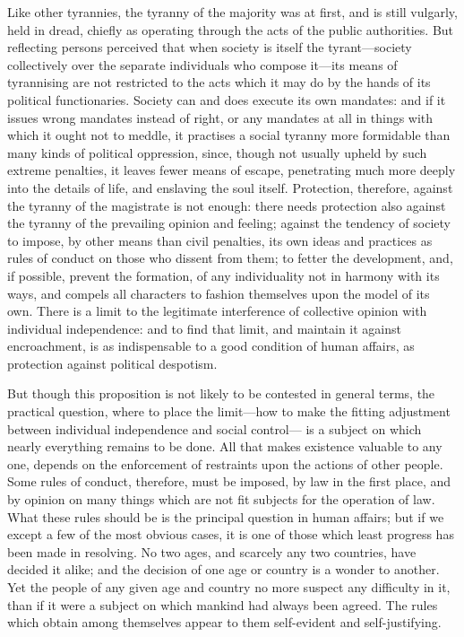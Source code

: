 \documentclass[11pt,openany]{book}
\begin{document}
Like other tyrannies, the tyranny of the majority was at first, and is still vulgarly, held in dread, chiefly as operating through the acts of the public authorities. But reflecting persons perceived that when society is itself the tyrant---society collectively over the separate individuals who compose it---its means of tyrannising are not restricted to the acts which it may do by the hands of its political functionaries. Society can and does execute its own mandates: and if it issues wrong mandates instead of right, or any mandates at all in things with which it ought not to meddle, it practises a social tyranny more formidable than many kinds of political oppression, since, though not usually upheld by such extreme penalties, it leaves fewer means of escape, penetrating much more deeply into the details of life, and enslaving the soul itself. Protection, therefore, against the tyranny of the magistrate is not enough: there needs protection also against the tyranny of the prevailing opinion and feeling; against the tendency of society to impose, by other means than civil penalties, its own ideas and practices as rules of conduct on those who dissent from them; to fetter the development, and, if possible, prevent the formation, of any individuality not in harmony with its ways, and compels all characters to fashion themselves upon the model of its own. There is a limit to the legitimate interference of collective opinion with individual independence: and to find that limit, and maintain it against encroachment, is as indispensable to a good condition of human affairs, as protection against political despotism.

But though this proposition is not likely to be contested in general terms, the practical question, where to place the limit---how to make the fitting adjustment between individual independence and social control--- is a subject on which nearly everything remains to be done. All that makes existence valuable to any one, depends on the enforcement of restraints upon the actions of other people. Some rules of conduct, therefore, must be imposed, by law in the first place, and by opinion on many things which are not fit subjects for the operation of law. What these rules should be is the principal question in human affairs; but if we except a few of the most obvious cases, it is one of those which least progress has been made in resolving. No two ages, and scarcely any two countries, have decided it alike; and the decision of one age or country is a wonder to another. Yet the people of any given age and country no more suspect any difficulty in it, than if it were a subject on which mankind had always been agreed. The rules which obtain among themselves appear to them self-evident and self-justifying.
\end{document}
